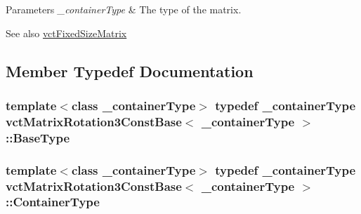\begin{DoxyParams}{Parameters}
{\em \+\_\+container\+Type} & The type of the matrix.\\
\hline
\end{DoxyParams}
\begin{DoxySeeAlso}{See also}
\hyperlink{classvct_fixed_size_matrix}{vct\+Fixed\+Size\+Matrix} 
\end{DoxySeeAlso}


\subsection{Member Typedef Documentation}
\hypertarget{classvct_matrix_rotation3_const_base_a1f40b2353fc88d70bf853d4557eaae99}{}
\subsubsection[{Base\+Type}]{\setlength{\rightskip}{0pt plus 5cm}template$<$class \+\_\+container\+Type$>$ typedef \+\_\+container\+Type {\bf vct\+Matrix\+Rotation3\+Const\+Base}$<$ \+\_\+container\+Type $>$\+::{\bf Base\+Type}}\label{classvct_matrix_rotation3_const_base_a1f40b2353fc88d70bf853d4557eaae99}
\hypertarget{classvct_matrix_rotation3_const_base_a59e670b3a79131c32fa5ce28a9275509}{}
\subsubsection[{Container\+Type}]{\setlength{\rightskip}{0pt plus 5cm}template$<$class \+\_\+container\+Type$>$ typedef \+\_\+container\+Type {\bf vct\+Matrix\+Rotation3\+Const\+Base}$<$ \+\_\+container\+Type $>$\+::{\bf Container\+Type}}\label{classvct_matrix_rotation3_const_base_a59e670b3a79131c32fa5ce28a9275509}
\hypertarget{classvct_matrix_rotation3_const_base_a913ecee79856db867ac6d45d27cfe362}{}
